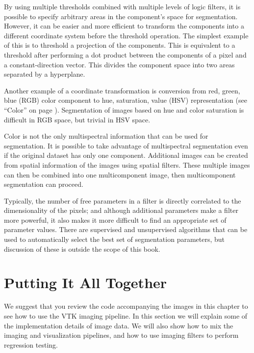 By using multiple thresholds combined with multiple levels of logic filters, it is possible to specify arbitrary areas in the component's space for segmentation. However, it can be easier and more efficient to transform the components into a different coordinate system before the threshold operation. The simplest example of this is to threshold a projection of the components. This is equivalent to a threshold after performing a dot product between the components of a pixel and a constant-direction vector. This divides the component space into two areas separated by a hyperplane.

Another example of a coordinate transformation is conversion from red, green, blue (RGB) color component to hue, saturation, value (HSV) representation (see ``Color'' on page \pageref{sec:color}). Segmentation of images based on hue and color saturation is difficult in RGB space, but trivial in HSV space.

Color is not the only multispectral information that can be used for segmentation. It is possible to take advantage of multispectral segmentation even if the original dataset has only one component. Additional images can be created from spatial information of the images using spatial filters. These multiple images can then be combined into one multicomponent image, then multicomponent segmentation can proceed.

Typically, the number of free parameters in a filter is directly correlated to the dimensionality of the pixels; and although additional parameters make a filter more powerful, it also makes it more difficult to find an appropriate set of parameter values. There are supervised and unsupervised algorithms that can be used to automatically select the best set of segmentation parameters, but discussion of these is outside the scope of this book.

\section{Putting It All Together}
\label{sec:chap10.putting_it_all_together}

We suggest that you review the code accompanying the images in this chapter to see how to use the VTK imaging pipeline. In this section we will explain some of the implementation details of image data. We will also show how to mix the imaging and visualization pipelines, and how to use imaging filters to perform regression testing.

